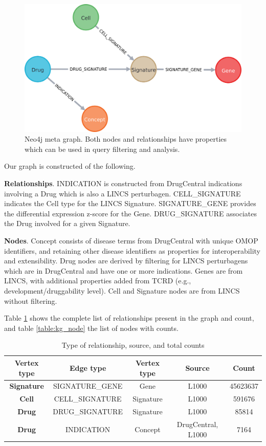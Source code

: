 \begin{figure}
	\includegraphics[width=\textwidth]{figures/kgap/KGAP_neo4jmetagraph.png}
	\caption{Neo4j meta graph. Both nodes and relationships have properties which can be used in query filtering and analysis.}
	\label{fig:neo4jmetagraph}
\end{figure}

Our graph is constructed of the following.

\textbf{Relationships}. INDICATION is constructed from DrugCentral indications  involving a Drug which is also a LINCS perturbagen. CELL\_SIGNATURE indicates the Cell type for the LINCS Signature. SIGNATURE\_GENE provides the differential expression z-score for the Gene. DRUG\_SIGNATURE associates the Drug involved for a given Signature.

\textbf{Nodes}. Concept consists of disease terms from DrugCentral with unique OMOP\cite{Hripcsak2019-ho} identifiers, and retaining other disease identifiers as properties for interoperability and extensibility. Drug nodes are derived by filtering for LINCS perturbagens which are in DrugCentral and have one or more indications.  Genes are from LINCS, with additional properties added from TCRD (e.g., development/druggability level). Cell and Signature nodes are from LINCS without filtering.

Table \ref{table:kg_rel} shows the complete list of relationships present in the graph and count, and table \ref{table:kg_node} the list of nodes with counts.

\begin{table}
\caption{Type of relationship, source, and total counts}
\begin{center}
\begin{tabular}{ |c|c|c|c|c| } 
\hline
\textbf{Vertex type} & \textbf{Edge type} & \textbf{Vertex type} & \textbf{Source} & \textbf{Count} \\ 
\hline
\textbf{Signature} & SIGNATURE\_GENE & Gene & L1000 & 45623637 \\ 
\hline
\textbf{Cell} & CELL\_SIGNATURE & Signature & L1000 & 591676 \\ 
\hline
\textbf{Drug} & DRUG\_SIGNATURE & Signature & L1000 & 85814 \\ 
\hline
\textbf{Drug} & INDICATION & Concept & DrugCentral, L1000 & 7164 \\ 
\hline
\end{tabular}
\end{center}
\label{table:kg_rel}
\end{table}

